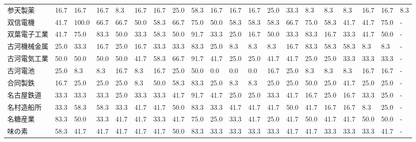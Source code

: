 \begin{tabular}{llllllllllllllllllll}
参天製薬            &   16.7 &   16.7 &      16.7 &       8.3 &       16.7 &   16.7 &   25.0 &   58.3 &    16.7 &    16.7 &   16.7 &  25.0 &   33.3 &     8.3 &     8.3 &   8.3 &  16.7 &  16.7 &   8.3 \\
双信電機            &   41.7 &  100.0 &      66.7 &      66.7 &       50.0 &   58.3 &   66.7 &   75.0 &    50.0 &    58.3 &   58.3 &  58.3 &   66.7 &    75.0 &    58.3 &  41.7 &  41.7 &  75.0 &     - \\
双葉電子工業          &   41.7 &   75.0 &      83.3 &      50.0 &       33.3 &   58.3 &   50.0 &   91.7 &    33.3 &    25.0 &   16.7 &  50.0 &   33.3 &    83.3 &    16.7 &  33.3 &  41.7 &  50.0 &     - \\
古河機械金属          &   25.0 &   33.3 &      16.7 &      25.0 &       16.7 &   33.3 &   33.3 &   83.3 &    25.0 &     8.3 &    8.3 &   8.3 &   16.7 &    83.3 &    58.3 &  58.3 &   8.3 &   8.3 &     - \\
古河電気工業          &   50.0 &   50.0 &      50.0 &      50.0 &       41.7 &   58.3 &   66.7 &   91.7 &    41.7 &    25.0 &   25.0 &  41.7 &   41.7 &    25.0 &    25.0 &  33.3 &  33.3 &  33.3 &     - \\
古河電池            &   25.0 &    8.3 &       8.3 &      16.7 &        8.3 &   16.7 &   25.0 &   50.0 &     0.0 &     0.0 &    0.0 &  16.7 &   25.0 &     8.3 &     8.3 &   8.3 &  16.7 &  16.7 &     - \\
合同製鉄            &   16.7 &   25.0 &      25.0 &      25.0 &        8.3 &   50.0 &   58.3 &   83.3 &    25.0 &     8.3 &    8.3 &  25.0 &   25.0 &    50.0 &    25.0 &  41.7 &  25.0 &  25.0 &     - \\
名古屋鉄道           &   33.3 &   33.3 &      33.3 &      25.0 &       33.3 &   33.3 &   41.7 &   91.7 &    41.7 &    25.0 &   25.0 &  33.3 &   41.7 &    16.7 &    25.0 &  16.7 &  33.3 &  25.0 &     - \\
名村造船所           &   33.3 &   58.3 &      58.3 &      33.3 &       41.7 &   41.7 &   50.0 &   83.3 &    33.3 &    41.7 &   41.7 &  41.7 &   50.0 &    41.7 &    16.7 &  16.7 &   8.3 &  25.0 &     - \\
名糖産業            &   83.3 &   50.0 &      33.3 &      41.7 &       41.7 &   33.3 &   41.7 &   75.0 &    25.0 &    33.3 &   41.7 &  25.0 &   41.7 &    50.0 &    41.7 &  41.7 &  50.0 &  50.0 &     - \\
味の素             &   58.3 &   41.7 &      41.7 &      41.7 &       41.7 &   41.7 &   50.0 &   83.3 &    33.3 &    33.3 &   33.3 &  33.3 &   41.7 &    41.7 &    33.3 &  33.3 &  33.3 &  41.7 &     - \\

\end{tabular}
